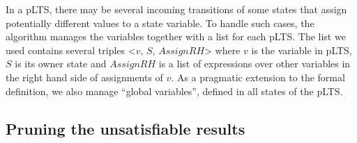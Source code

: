 \documentclass{lncs/llncs}
\newcommand{\QIN}[1]{\textcolor{airforceblue}{#1}}
\begin{document}
In a pLTS, there may be several incoming transitions of some states
that assign potentially different values to a state variable.
To handle such cases, the algorithm manages the variables together
with a list for each pLTS.
The list we used contains several triples <$v$, $S$, $AssignRH$> 
where $v$ is the variable in pLTS, $S$ is its owner state and
$AssignRH$ is a list of expressions over other variables in the right
hand side of assignments of $v$.
As a pragmatic extension to the formal definition, we also manage
``global variables'', defined in all states of the pLTS.




\subsection{Pruning the unsatisfiable results}
\label{section:pruning}
\end{document}
